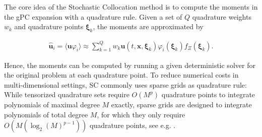 The core idea of the Stochastic Collocation method is to compute the moments in the gPC expansion with a quadrature rule. Given a set of $Q$ quadrature weights $w_k$ and quadrature points $\bm{\xi}_k$, the moments are approximated by
\begin{linenomath*}\begin{align*}
\bm{\hat u}_i = \langle \bm{u}\varphi_i \rangle \approx \sum_{k = 1}^{Q}w_k \bm{u}({t,\bm{x},\bm{\xi}_k})\varphi_i(\bm{\xi}_k)f_{\Xi}(\bm{\xi}_k).
\end{align*}\end{linenomath*} 
Hence, the moments can be computed by running a given deterministic solver for the original problem at each quadrature point. To reduce numerical costs in multi-dimensional settings, SC commonly uses sparse grids as quadrature rule: While tensorized quadrature sets require $O(M^p)$ quadrature points to integrate polynomials of maximal degree $M$ exactly, sparse grids are designed to integrate polynomials of total degree $M$, for which they only require $O(M(\log_2(M)^{p-1}))$ quadrature points, see e.g. \cite{trefethen2017cubature}.

